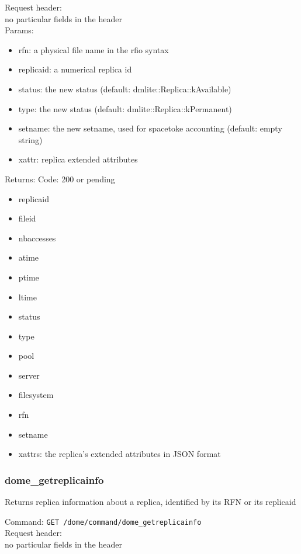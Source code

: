 \documentclass[a4paper,10pt]{scrreprt}
\begin{document}
Request header:\\
no particular fields in the header\\

Params:
\begin{itemize}
 \item rfn: a physical file name in the rfio syntax
 \item replicaid: a numerical replica id
 \item status: the new status (default: dmlite::Replica::kAvailable)
 \item type: the new status (default: dmlite::Replica::kPermanent)
 \item setname: the new setname, used for spacetoke accounting (default: empty string)
 \item xattr: replica extended attributes
\end{itemize}

Returns:
Code: 200 or pending
\begin{itemize}

 \item replicaid
 \item fileid
 \item nbaccesses
 \item atime
 \item ptime
 \item ltime
 \item status
 \item type
 \item pool
 \item server
 \item filesystem
 \item rfn
 \item setname
 \item xattrs: the replica's extended attributes in JSON format
\end{itemize}




\subsubsection{dome\_getreplicainfo}
Returns replica information about a replica, identified by its RFN or its replicaid

Command:
\lstinline"GET /dome/command/dome_getreplicainfo"\\

Request header:\\
no particular fields in the header\\
\end{document}
